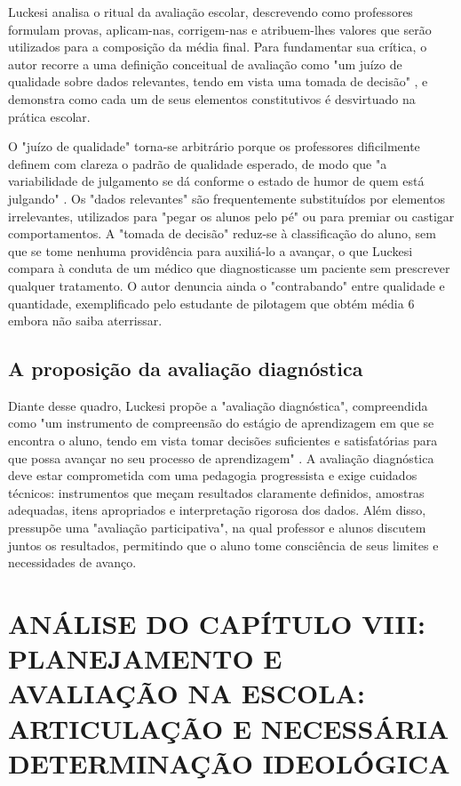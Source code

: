 Luckesi analisa o ritual da avaliação escolar, descrevendo como professores formulam provas, aplicam-nas, corrigem-nas e atribuem-lhes valores que serão utilizados para a composição da média final. Para fundamentar sua crítica, o autor recorre a uma definição conceitual de avaliação como "um juízo de qualidade sobre dados relevantes, tendo em vista uma tomada de decisão" \cite{luckesi-avaprend}, e demonstra como cada um de seus elementos constitutivos é desvirtuado na prática escolar.

O "juízo de qualidade" torna-se arbitrário porque os professores dificilmente definem com clareza o padrão de qualidade esperado, de modo que "a variabilidade de julgamento se dá conforme o estado de humor de quem está julgando" \cite{luckesi-avaprend}. Os "dados relevantes" são frequentemente substituídos por elementos irrelevantes, utilizados para "pegar os alunos pelo pé" ou para premiar ou castigar comportamentos. A "tomada de decisão" reduz-se à classificação do aluno, sem que se tome nenhuma providência para auxiliá-lo a avançar, o que Luckesi compara à conduta de um médico que diagnosticasse um paciente sem prescrever qualquer tratamento. O autor denuncia ainda o "contrabando" entre qualidade e quantidade, exemplificado pelo estudante de pilotagem que obtém média 6 embora não saiba aterrissar.

\subsection{A proposição da avaliação diagnóstica}

Diante desse quadro, Luckesi propõe a "avaliação diagnóstica", compreendida como "um instrumento de compreensão do estágio de aprendizagem em que se encontra o aluno, tendo em vista tomar decisões suficientes e satisfatórias para que possa avançar no seu processo de aprendizagem" \cite{luckesi-avaprend}. A avaliação diagnóstica deve estar comprometida com uma pedagogia progressista e exige cuidados técnicos: instrumentos que meçam resultados claramente definidos, amostras adequadas, itens apropriados e interpretação rigorosa dos dados. Além disso, pressupõe uma "avaliação participativa", na qual professor e alunos discutem juntos os resultados, permitindo que o aluno tome consciência de seus limites e necessidades de avanço.

\section{ANÁLISE DO CAPÍTULO VIII: PLANEJAMENTO E AVALIAÇÃO NA ESCOLA: ARTICULAÇÃO E NECESSÁRIA DETERMINAÇÃO IDEOLÓGICA}

